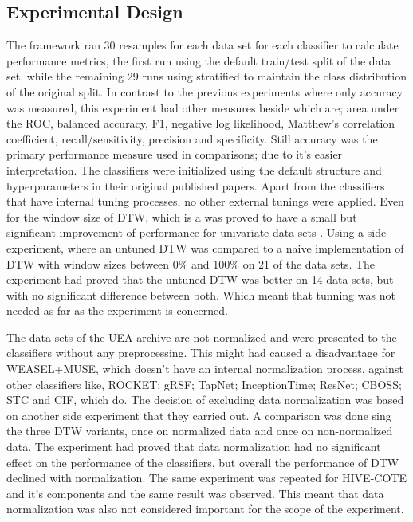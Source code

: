 \subsection{Experimental Design}
\label{subsectionMultiBakeoffExperiment}
The framework ran 30 resamples for each data set for each classifier to calculate performance metrics, the first run using the default train/test split of the data set, while the remaining 29 runs using
stratified to maintain the class distribution of the original split.
In contrast to the previous experiments where only accuracy was measured, this experiment had other measures beside which are; area under the ROC, balanced accuracy, F1, negative log likelihood,
Matthew’s correlation coefficient, recall/sensitivity, precision and specificity. Still accuracy was the primary performance measure used in comparisons; due to it's easier interpretation.
The classifiers were initialized using the default structure and hyperparameters in their original published papers.
Apart from the classifiers that have internal tuning processes, no other external tunings were applied.
Even for the window size of DTW, which is a was proved to have a small but significant improvement of performance for univariate data sets \cite{ratanamahatana2005three}.
Using a side experiment, where an untuned DTW was compared to a naive implementation of DTW with window sizes between 0\% and 100\% on 21 of the data sets.
The experiment had proved that the untuned DTW was better on 14 data sets, but with no significant difference between both.
Which meant that tunning was not needed as far as the experiment is concerned.

The data sets of the UEA archive are not normalized and were presented to the classifiers without any preprocessing.
This might had caused a disadvantage for WEASEL+MUSE, which doesn't have an internal normalization process, against other classifiers like,
ROCKET; gRSF; TapNet; InceptionTime; ResNet; CBOSS; STC and CIF, which do.
The decision of excluding data normalization was based on another side experiment that they carried out.
A comparison was done sing the three DTW variants, once on normalized data and once on non-normalized data.
The experiment had proved that data normalization had no significant effect on the performance of the classifiers, but overall the performance of DTW declined with normalization.
The same experiment was repeated for HIVE-COTE and it's components and the same result was observed.
This meant that data normalization was also not considered important for the scope of the experiment.

